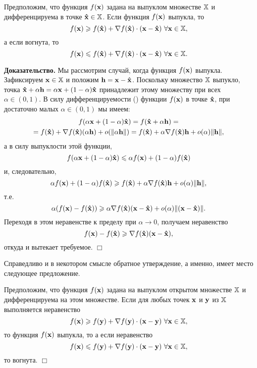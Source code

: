 \begin{prop}
    Предположим, что функция $f(\mathbf{x})$ задана на выпуклом множестве
    $\mathbb{X}$  и дифференцируема в точке $\mathbf{\hat x} \in \mathbb{X}$.
    Если функция $f(\mathbf{x})$ выпукла, то
\[
    f(\mathbf{x}) \geqslant f(\mathbf{\hat x}) + \nabla f(\mathbf{\hat x}) \cdot
    (\mathbf{x}-\mathbf{\hat x}) \ \forall \mathbf{x} \in  \mathbb{X},
\]
    а если вогнута, то
\[
    f(\mathbf{x}) \leqslant f(\mathbf{\hat x}) + \nabla f(\mathbf{\hat x}) \cdot
    (\mathbf{x}-\mathbf{\hat x}) \ \forall \mathbf{x} \in  \mathbb{X}.
\]
\end{prop}
    \textbf{Доказательство.} Мы рассмотрим случай, когда функция $f(\mathbf{x})$
    выпукла.
    Зафиксируем $\mathbf{x} \in  \mathbb{X}$ и положим $\mathbf{h}=\mathbf{x}-\mathbf{\hat x}$.
    Поскольку множество $\mathbb{X}$ выпукло, точка
    $\mathbf{\hat x}+\alpha\mathbf{h}=\alpha\mathbf{x}+(1-\alpha)\mathbf{\hat x}$
    принадлежит этому множеству при всех $\alpha\in(0,1)$. В силу
    дифференцируемости () функции $f(\mathbf{x})$  в точке $\mathbf{\hat x}$, при
    достаточно малых $\alpha\in(0,1)$ мы имеем:
\begin{multline*}
    f(\alpha\mathbf{x}+(1-\alpha)\mathbf{\hat x})
    =f(\mathbf{\hat x}+\alpha\mathbf{h})= \\
    =f(\mathbf{\hat x})+\nabla f(\mathbf{\hat x})(\alpha\mathbf{h})+o(\|\alpha\mathbf{h}\|)
    =f(\mathbf{\hat x})+\alpha\nabla f(\mathbf{\hat x})\mathbf{h}+o(\alpha)\|\mathbf{h}\|,
\end{multline*}
    а в силу выпуклости этой функции,
\[
    f(\alpha\mathbf{x}+(1-\alpha)\mathbf{\hat x})\leqslant
    \alpha f(\mathbf{x})+(1-\alpha)f(\mathbf{\hat x})
\]
    и, следовательно,
\[
    \alpha f(\mathbf{x})+(1-\alpha)f(\mathbf{\hat x})
    \geqslant f(\mathbf{\hat x})+\alpha\nabla f(\mathbf{\hat x})\mathbf{h}+o(\alpha)\|\mathbf{h}\|,
\]
    т.е.
\[
    \alpha(f(\mathbf{x})-f(\mathbf{\hat x}))
    \geqslant \alpha\nabla f(\mathbf{\hat x})(\mathbf{x}-\mathbf{\hat x})+o(\alpha)\|(\mathbf{x}-\mathbf{\hat x})\|.
\]
    Переходя в этом неравенстве к пределу при $\alpha\rightarrow 0$,
    получаем неравенство
\[
    f(\mathbf{x})-f(\mathbf{\hat x})\geqslant \nabla f(\mathbf{\hat x})(\mathbf{x}-\mathbf{\hat
    x}),
\]
    откуда и вытекает требуемое.    $\Box$

    Справедливо и в некотором смысле обратное утверждение, а именно,
    имеет место следующее предложение.

\begin{prop}
    Предположим, что функция $f(\mathbf{x})$ задана  на выпуклом открытом множестве
    $\mathbb{X}$  и дифференцируема на этом множестве. Если для любых
    точек $\mathbf{x}$ и $\mathbf{y}$ из $\mathbb{X}$ выполняется неравенство
\[
    f(\mathbf{x}) \geqslant f(\mathbf{y}) + \nabla f(\mathbf{y}) \cdot
    (\mathbf{x}-\mathbf{y}) \ \forall \mathbf{x} \in  \mathbb{X},
\]
    то функция $f(\mathbf{x})$ выпукла, то а если неравенство
\[
    f(\mathbf{x}) \leqslant f(\mathbf{y}) + \nabla f(\mathbf{y}) \cdot
    (\mathbf{x}-\mathbf{y}) \ \forall \mathbf{x} \in  \mathbb{X},
\]
    то вогнута. $\Box$
\end{prop}


